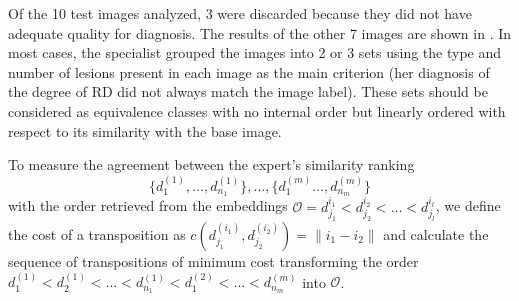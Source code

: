 \begin{table}[tb]
\centering
\footnotesize
{}
\caption{Summary of the results of experiment 1. The first column contains the IDs of the base images. The second column shows the specialist's order (no order is assumed within each set). The last column shows the order according to the cosine similarity and the embeddings. Images 6788l and 31428l were discarded by the specialist due to their quality.}
\label{tab:exp1}
\end{table}

Of the 10 test images analyzed, 3 were discarded because they did not have adequate quality for diagnosis. The results of the other 7 images are shown in . In most cases, the specialist grouped the images into 2 or 3 sets using the type and number of lesions present in each image as the main criterion (her diagnosis of the degree of RD did not always match the image label). These sets should be considered as equivalence classes with no internal order but linearly ordered with respect to its similarity with the base image.

To measure the agreement between the expert's similarity ranking \[ \{ d^{(1)}_1, \dots, d^{(1)}_{n_{1}} \}, \dots, \{ d^{(m)}_1 \dots, d^{(m)}_{n_{m}} \} \]  with the order retrieved from the embeddings \( \mathcal{O} = d^{i_1}_{j_1} < d^{i_2}_{j_2} < \dots < d^{i_l}_{j_l} \), we define the cost of a transposition as \( c(d^{(i_1)}_{j_1}, d^{(i_2)}_{j_2}) = \|i_1 - i_2\| \) and calculate the sequence of transpositions of minimum cost transforming the order \( d^{(1)}_1 < d^{(1)}_2 < \dots < d^{(1)}_{n_{1}} < d^{(2)}_1 < \dots < d^{(m)}_{n_{m}}\) into \( \mathcal{O} \). 

